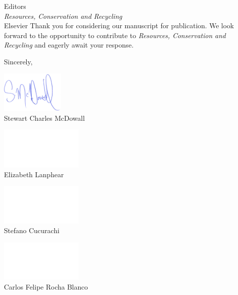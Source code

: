 \documentclass[10pt]{letter}
\begin{document}
\begin{letter}{Editors\\\textit{Resources, Conservation and Recycling}\\Elsevier}
    Thank you for considering our manuscript for publication. We look forward to the opportunity to contribute to \textit{Resources, Conservation and Recycling} and eagerly await your response.

    \vspace{1em}

    \closing{Sincerely,}
    \begin{center}
        \begin{minipage}[t]{0.25\textwidth}
            \centering
            \vspace{-2cm}
            \includegraphics[height=2cm]{signature_scm.png}\\ %
            Stewart Charles McDowall\\
        \end{minipage}%
        \begin{minipage}[t]{0.25\textwidth}
            \centering
            \vspace{-2cm}
            \includegraphics[height=2cm]{dummy_signature.png}\\ %
            Elizabeth Lanphear
        \end{minipage}%
        \begin{minipage}[t]{0.25\textwidth}
            \centering
            \vspace{-2cm}
            \includegraphics[height=2cm]{dummy_signature.png}\\ %
            Stefano Cucurachi
        \end{minipage}%
        \begin{minipage}[t]{0.25\textwidth}
            \centering
            \vspace{-2cm}
            \includegraphics[height=2cm]{dummy_signature.png}\\ %
            Carlos Felipe Rocha Blanco
        \end{minipage}
    \end{center}


\end{letter}
\end{document}
